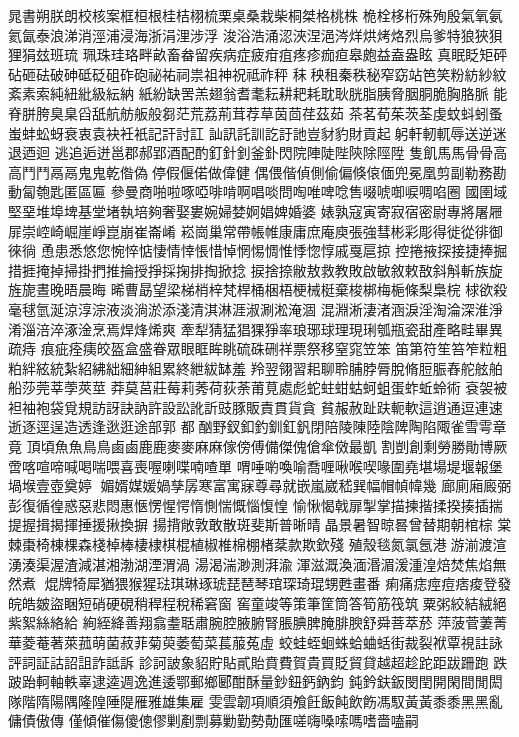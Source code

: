 晁書朔朕朗校核案框桓根桂桔栩梳栗桌桑栽柴桐桀格桃株
桅栓栘桁殊殉殷氣氧氨氦氤泰浪涕消涇浦浸海浙涓浬涉浮
浚浴浩涌涊浹涅浥涔烊烘烤烙烈烏爹特狼狹狽狸狷玆班琉
珮珠珪珞畔畝畜畚留疾病症疲疳疽疼疹痂疸皋皰益盍盎眩
真眠眨矩砰砧砸砝破砷砥砭砠砟砲祕祐祠祟祖神祝祗祚秤
秣秧租秦秩秘窄窈站笆笑粉紡紗紋紊素索純紐紕級紜納
紙紛缺罟羔翅翁耆耄耘耕耙耗耽耿胱脂胰脅胭胴脆胸胳脈
能脊胼胯臭臬舀舐航舫舨般芻茫荒荔荊茸荐草茵茴荏茲茹
茶茗荀茱茨荃虔蚊蚪蚓蚤蚩蚌蚣蚜衰衷袁袂衽衹記訐討訌
訕訊託訓訖訏訑豈豺豹財貢起躬軒軔軏辱送逆迷退迺迴
逃追逅迸邕郡郝郢酒配酌釘針釗釜釙閃院陣陡陛陝除陘陞
隻飢馬⾺骨⾻高⾼⾾鬥鬲⿀鬼⿁乾偺偽停假偃偌做偉健
偶偎偕偵側偷偏倏偯偭兜冕凰剪副勒務勘動匐匏匙匿區匾
參曼商啪啦啄啞啡啃啊唱啖問啕唯啤唸售啜唬啣唳啁啗圈
國圉域堅堊堆埠埤基堂堵執培夠奢娶婁婉婦婪婀娼婢婚婆
婊孰寇寅寄寂宿密尉專將屠屜屝崇崆崎崛崖崢崑崩崔崙崤
崧崗巢常帶帳帷康庸庶庵庾張強彗彬彩彫得徙從徘御徠徜
恿患悉悠您惋悴惦悽情悻悵惜悼惘惕惆惟悸惚惇戚戛扈掠
控捲掖探接捷捧掘措捱掩掉掃掛捫推掄授掙採掬排掏掀捻
捩捨捺敝敖救教敗啟敏敘敕敔斜斛斬族旋旌旎晝晚晤晨晦
晞曹勗望梁梯梢梓梵桿桶梱梧梗械梃棄梭梆梅梔條梨梟梡
梂欲殺毫毬氫涎涼淳淙液淡淌淤添淺清淇淋涯淑涮淞淹涸
混淵淅淒渚涵淚淫淘淪深淮淨淆淄涪淬涿淦烹焉焊烽烯爽
牽犁猜猛猖猓猙率琅琊球理現琍瓠瓶瓷甜產略畦畢異疏痔
痕疵痊痍皎盔盒盛眷眾眼眶眸眺硫硃硎祥票祭移窒窕笠笨
笛第符笙笞笮粒粗粕絆絃統紮紹紼絀細紳組累終紲紱缽羞
羚翌翎習耜聊聆脯脖脣脫脩脰脤舂舵舷舶船莎莞莘荸莢莖
莽莫莒莊莓莉莠荷荻荼莆莧處彪蛇蛀蚶蛄蚵蛆蛋蚱蚯蛉術
袞袈被袒袖袍袋覓規訪訝訣訥許設訟訛訢豉豚販責貫貨貪
貧赧赦趾趺軛軟這逍通逗連速逝逐逕逞造透逢逖逛途部郭
都酗野釵釦釣釧釭釩閉陪陵陳陸陰陴陶陷陬雀雪雩章竟
頂頃魚⿂鳥⿃鹵⿄鹿⿅麥⿆麻⿇傢傍傅備傑傀傖傘傚最凱
割剴創剩勞勝勛博厥啻喀喧啼喊喝喘喂喜喪喔喇喋喃喳單
喟唾喲喚喻喬喱啾喉喫喙圍堯堪場堤堰報堡堝堠壹壺奠婷
媚婿媒媛媧孳孱寒富寓寐尊尋就嵌嵐崴嵇巽幅帽幀幃幾
廊廁廂廄弼彭復循徨惑惡悲悶惠愜愣惺愕惰惻惴慨惱愎惶
愉愀愒戟扉掣掌描揀揩揉揆揍插揣提握揖揭揮捶援揪換摒
揚揹敞敦敢散斑斐斯普晰晴晶景暑智晾晷曾替期朝棺棕
棠棘棗椅棟棵森棧棹棒棲棣棋棍植椒椎棉棚楮棻款欺欽殘
殖殼毯氮氯氬港游湔渡渲湧湊渠渥渣減湛湘渤湖湮渭渦
湯渴湍渺測湃渝渾滋溉渙湎湣湄湲湩湟焙焚焦焰無然煮
焜牌犄犀猶猥猴猩琺琪琳琢琥琵琶琴琯琛琦琨甥甦畫番
痢痛痣痙痘痞痠登發皖皓皴盜睏短硝硬硯稍稈程稅稀窘窗
窖童竣等策筆筐筒答筍筋筏筑粟粥絞結絨絕紫絮絲絡給
絢絰絳善翔翕耋聒肅腕腔腋腑腎脹腆脾腌腓腴舒舜菩萃菸
萍菠菅萋菁華菱菴著萊菰萌菌菽菲菊萸萎萄菜萇菔菟虛
蛟蛙蛭蛔蛛蛤蛐蛞街裁裂袱覃視註詠評詞証詁詔詛詐詆訴
診訶詖象貂貯貼貳貽賁費賀貴買貶貿貸越超趁跎距跋跚跑
跌跛跆軻軸軼辜逮逵週逸進逶鄂郵鄉郾酣酥量鈔鈕鈣鈉鈞
鈍鈐鈇鈑閔閏開閑間閒閎隊階隋陽隅隆隍陲隄雁雅雄集雇
雯雲韌項順須飧飪飯飩飲飭馮馭黃⿈黍⿉黑⿊亂傭債傲傳
僅傾催傷傻傯僇剿剷剽募勦勤勢勣匯嗟嗨嗓嗦嗎嗜嗇嗑嗣
